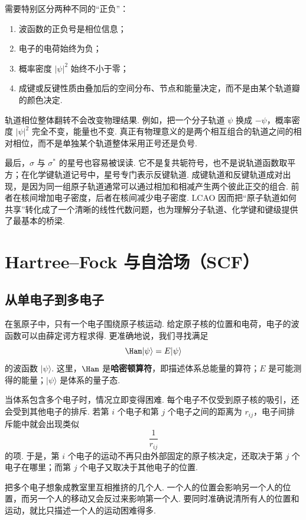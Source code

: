 \documentclass[UTF8,11pt,a4paper,openany]{ctexbook}
\newcommand{\ket}[1]{\lvert #1\rangle}\newcommand{\bra}[1]{\langle #1\rvert}
\newcommand{\term}[1]{\textbf{#1}}
\begin{document}
需要特别区分两种不同的“正负”：

\begin{enumerate}
\item 波函数的正负号是相位信息；
\item 电子的电荷始终为负；
\item 概率密度 $|\psi|^2$ 始终不小于零；
\item 成键或反键性质由叠加后的空间分布、节点和能量决定，而不是由某个轨道瓣的颜色决定. 
\end{enumerate}

\begin{limitbox}
轨道相位整体翻转不会改变物理结果. 例如，把一个分子轨道 $\psi$ 换成 $-\psi$，概率密度 $|\psi|^2$ 完全不变，能量也不变. 真正有物理意义的是两个相互组合的轨道之间的相对相位，而不是单独某个轨道整体采用正号还是负号. 
\end{limitbox}

最后，$\sigma$ 与 $\sigma^*$ 的星号也容易被误读. 它不是复共轭符号，也不是说轨道函数取平方；在化学键轨道记号中，星号专门表示反键轨道. 成键轨道和反键轨道成对出现，是因为同一组原子轨道通常可以通过相加和相减产生两个彼此正交的组合. 前者在核间增加电子密度，后者在核间减少电子密度. LCAO 因而把“原子轨道如何共享”转化成了一个清晰的线性代数问题，也为理解分子轨道、化学键和键级提供了最基本的桥梁. 
\chapter{Hartree--Fock 与自洽场（SCF）}

\section{从单电子到多电子}

在氢原子中，只有一个电子围绕原子核运动. 给定原子核的位置和电荷，电子的波函数可以由薛定谔方程求得. 更准确地说，我们寻找满足
\[
\Ham\ket{\psi}=E\ket{\psi}
\]
的波函数 $\ket{\psi}$. 这里，$\Ham$ 是\term{哈密顿算符}，即描述体系总能量的算符；$E$ 是可能测得的能量；$\ket{\psi}$ 是体系的量子态. 

当体系包含多个电子时，情况立即变得困难. 每个电子不仅受到原子核的吸引，还会受到其他电子的排斥. 若第 $i$ 个电子和第 $j$ 个电子之间的距离为 $r_{ij}$，电子间排斥能中就会出现类似
\[
\frac{1}{r_{ij}}
\]
的项. 于是，第 $i$ 个电子的运动不再只由外部固定的原子核决定，还取决于第 $j$ 个电子在哪里；而第 $j$ 个电子又取决于其他电子的位置. 

\begin{analogybox}
把多个电子想象成教室里互相推挤的几个人. 一个人的位置会影响另一个人的位置，而另一个人的移动又会反过来影响第一个人. 要同时准确说清所有人的位置和运动，就比只描述一个人的运动困难得多. 
\end{analogybox}
\end{document}
